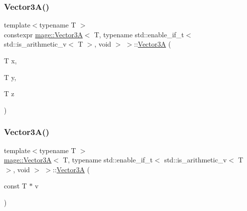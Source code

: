 \subsubsection{\texorpdfstring{Vector3\+A()}{Vector3A()}\hspace{0.1cm}{\footnotesize\ttfamily [2/8]}}
{\footnotesize\ttfamily template$<$typename T $>$ \\
constexpr \hyperlink{structmage_1_1_vector3_a}{mage\+::\+Vector3A}$<$ T, typename std\+::enable\+\_\+if\+\_\+t$<$ std\+::is\+\_\+arithmetic\+\_\+v$<$ T $>$, void $>$ $>$\+::\hyperlink{structmage_1_1_vector3_a}{Vector3A} (\begin{DoxyParamCaption}\item[{T}]{x,  }\item[{T}]{y,  }\item[{T}]{z }\end{DoxyParamCaption})\hspace{0.3cm}{\ttfamily [noexcept]}}

\hypertarget{structmage_1_1_vector3_a_3_01_t_00_01typename_01std_1_1enable__if__t_3_01std_1_1is__arithmetic__7070ab83646a86866d1e3c9d7eeea37a_a7e44a1f1a7008b4aa16886284659a73a}{}\label{structmage_1_1_vector3_a_3_01_t_00_01typename_01std_1_1enable__if__t_3_01std_1_1is__arithmetic__7070ab83646a86866d1e3c9d7eeea37a_a7e44a1f1a7008b4aa16886284659a73a} 
\subsubsection{\texorpdfstring{Vector3\+A()}{Vector3A()}\hspace{0.1cm}{\footnotesize\ttfamily [3/8]}}
{\footnotesize\ttfamily template$<$typename T $>$ \\
\hyperlink{structmage_1_1_vector3_a}{mage\+::\+Vector3A}$<$ T, typename std\+::enable\+\_\+if\+\_\+t$<$ std\+::is\+\_\+arithmetic\+\_\+v$<$ T $>$, void $>$ $>$\+::\hyperlink{structmage_1_1_vector3_a}{Vector3A} (\begin{DoxyParamCaption}\item[{const T $\ast$}]{v }\end{DoxyParamCaption})\hspace{0.3cm}{\ttfamily [noexcept]}}

